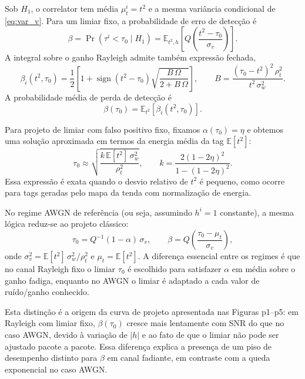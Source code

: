\documentclass{sbrt}
\begin{document}
Sob $H_1$, o correlator tem média $\mu_t^i = t^2$ e a mesma variância condicional de \eqref{eq:var_v}. Para um limiar fixo, a probabilidade de erro de detecção é
\begin{equation}\label{eq:beta_def}
    \beta = \Pr(\tau^i < \tau_0 \mid H_1) = \mathbb{E}_{t^2,h}\left[Q\left(\frac{t^2 - \tau_0}{\sigma_v}\right)\right].
\end{equation}
A integral sobre o ganho Rayleigh admite também expressão fechada,
\begin{equation}\label{eq:beta_rayleigh_closed}
    \beta_i(t^2,\tau_0) = \frac{1}{2} \left[1 + \operatorname{sign}(t^2 - \tau_0)
    \sqrt{\frac{B\,\Omega}{2 + B\,\Omega}}\right],
    \qquad B = \frac{(\tau_0 - t^2)^2\,\rho_t^2}{t^2\,\sigma_w^2}.
\end{equation}
A probabilidade média de perda de detecção é
\begin{equation}\label{eq:beta_avg}
    \beta(\tau_0) = \mathbb{E}_{t^2}\left[\beta_i(t^2,\tau_0)\right].
\end{equation}

Para projeto de limiar com falso positivo fixo, fixamos $\alpha(\tau_0)=\eta$ e obtemos uma solução aproximada em termos da energia média da tag $\mathbb{E}[t^2]$:
\begin{equation}\label{eq:tau0_solution}
    \tau_0 \approx \sqrt{\frac{k\,\mathbb{E}[t^2] \, \sigma_w^2}{\rho_t^2}},
    \qquad k = \frac{2(1-2\eta)^2}{1 - (1-2\eta)^2}.
\end{equation}
Essa expressão é exata quando o desvio relativo de $t^2$ é pequeno, como ocorre para tags geradas pelo mapa da tenda com normalização de energia.

No regime AWGN de referência (ou seja, assumindo $h^i=1$ constante), a mesma lógica reduz-se ao projeto clássico:
\begin{equation}\label{eq:tau0_awgn}
    \tau_0 = Q^{-1}(1-\alpha)\,\sigma_v,
    \qquad \beta = Q\left(\frac{\tau_0 - \mu_t}{\sigma_v}\right),
\end{equation}
onde $\sigma_v^2 = \mathbb{E}[t^2]\,\sigma_w^2/\rho_t^2$ e $\mu_t = \mathbb{E}[t^2]$. A diferença essencial entre os regimes é que no canal Rayleigh fixo o limiar $\tau_0$ é escolhido para satisfazer $\alpha$ em média sobre o ganho fadiga, enquanto no AWGN o limiar é adaptado a cada valor de ruído/ganho conhecido.

Esta distinção é a origem da curva de projeto apresentada nas Figuras p1--p5: em Rayleigh com limiar fixo, $\beta(\tau_0)$ cresce mais lentamente com SNR do que no caso AWGN, devido à variação de $|h|$ e ao fato de que o limiar não pode ser ajustado pacote a pacote. Essa diferença explica a presença de um piso de desempenho distinto para $\beta$ em canal fadiante, em contraste com a queda exponencial no caso AWGN.
\end{document}

